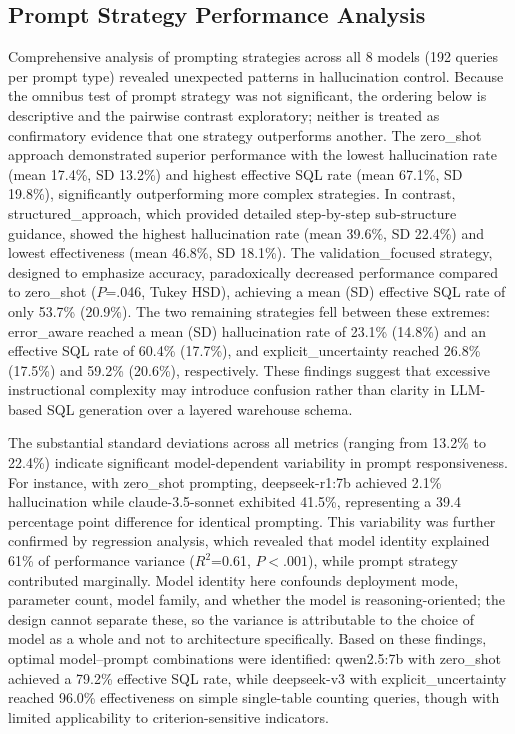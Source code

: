 \documentclass[applsci,article,submit,pdftex,oneauthor]{Definitions/mdpi}
\begin{document}
\subsection{Prompt Strategy Performance Analysis}
Comprehensive analysis of prompting strategies across all 8 models (192 queries
per prompt type) revealed unexpected patterns in hallucination control. Because the omnibus test of prompt strategy was not significant, the ordering below is descriptive and the pairwise contrast exploratory; neither is treated as confirmatory evidence that one strategy outperforms another. The
zero\_shot approach demonstrated superior performance with the lowest
hallucination rate (mean 17.4\%, SD 13.2\%) and highest effective SQL rate (mean 67.1\%, SD 19.8\%), significantly outperforming more complex strategies. In
contrast, structured\_approach, which provided detailed step-by-step
sub-structure guidance, showed the highest hallucination rate (mean 39.6\%, SD 22.4\%) and lowest effectiveness (mean 46.8\%, SD 18.1\%). The
validation\_focused strategy, designed to emphasize accuracy, paradoxically
decreased performance compared to zero\_shot ($P$=.046, Tukey HSD), achieving a mean (SD) effective SQL rate of only 53.7\% (20.9\%). The two remaining
strategies fell between these extremes: error\_aware reached a mean (SD) hallucination rate of 23.1\% (14.8\%) and an effective SQL rate of 60.4\% (17.7\%), and explicit\_uncertainty reached 26.8\% (17.5\%) and 59.2\% (20.6\%), respectively. These findings suggest
that excessive instructional complexity may introduce confusion rather than
clarity in LLM-based SQL generation over a layered warehouse schema.

The substantial standard deviations across all metrics (ranging from 13.2\% to 22.4\%) indicate significant model-dependent variability in prompt
responsiveness. For instance, with zero\_shot prompting, deepseek-r1:7b achieved 2.1\% hallucination while claude-3.5-sonnet exhibited 41.5\%, representing a 39.4 percentage point difference for identical prompting. This variability was
further confirmed by regression analysis, which revealed that model identity
explained 61\% of performance variance ($R^2$=0.61, $P<.001$), while prompt strategy contributed marginally. Model identity here confounds deployment mode, parameter count, model family, and whether the model is reasoning-oriented; the design cannot separate these, so the variance is attributable to the choice of model as a whole and not to architecture specifically. Based on these findings, optimal model--prompt
combinations were identified: qwen2.5:7b with zero\_shot achieved a 79.2\% effective SQL rate, while deepseek-v3 with explicit\_uncertainty reached 96.0\% effectiveness on simple single-table counting queries, though with limited
applicability to criterion-sensitive indicators.
\end{document}
